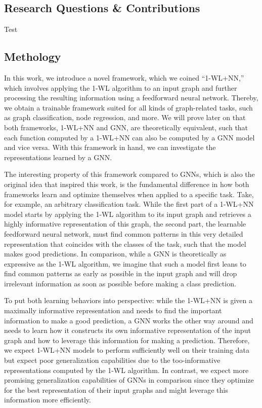 \subsection{Research Questions \& Contributions}
Test

\subsection{Methology}
In this work, we introduce a novel framework, which we coined ``1-WL+NN,'' which involves applying the 1-WL algorithm to an input graph and further processing the resulting information using a feedforward neural network. Thereby, we obtain a trainable framework suited for all kinds of graph-related tasks, such as graph classification, node regression, and more. We will prove later on that both frameworks, 1-WL+NN and GNN, are theoretically equivalent, such that each function computed by a 1-WL+NN can also be computed by a GNN model and vice versa. With this framework in hand, we can investigate the representations learned by a GNN.

The interesting property of this framework compared to GNNs, which is also the original idea that inspired this work, is the fundamental difference in how both frameworks learn and optimize themselves when applied to a specific task. Take, for example, an arbitrary classification task. While the first part of a 1-WL+NN model starts by applying the 1-WL algorithm to its input graph and retrieves a highly informative representation of this graph, the second part, the learnable feedforward neural network, must find common patterns in this very detailed representation that coincides with the classes of the task, such that the model makes good predictions. In comparison, while a GNN is theoretically as expressive as the 1-WL algorithm, we imagine that such a model first leans to find common patterns as early as possible in the input graph and will drop irrelevant information as soon as possible before making a class prediction. 

To put both learning behaviors into perspective: while the 1-WL+NN is given a maximally informative representation and needs to find the important information to make a good prediction, a GNN works the other way around and needs to learn how it constructs its own informative representation of the input graph and how to leverage this information for making a prediction. Therefore, we expect 1-WL+NN models to perform sufficiently well on their training data but expect poor generalization capabilities due to the too-informative representations computed by the 1-WL algorithm. In contrast, we expect more promising generalization capabilities of GNNs in comparison since they optimize for the best representation of their input graphs and might leverage this information more efficiently. 

